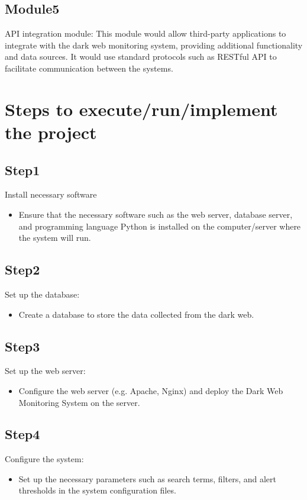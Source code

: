\documentclass[10pt]{report}
\begin{document}
\subsection{Module5}
API integration module: 
This module would allow third-party applications to integrate with the dark web monitoring system, providing additional functionality and data sources. It would use standard protocols such as RESTful API to facilitate communication between the systems.



\section{Steps to execute/run/implement the project}
\subsection{Step1}
Install necessary software
\begin{itemize}
    \item Ensure that the necessary software such as the web server, database server, and programming language Python is installed on the computer/server where the system will run. 
\end{itemize}

\subsection{Step2}
Set up the database: 
\begin{itemize}
    \item Create a database to store the data collected from the dark web.
\end{itemize}


\subsection{Step3}
Set up the web server:
\begin{itemize}
    \item Configure the web server (e.g. Apache, Nginx) and deploy the Dark Web Monitoring System on the server.
\end{itemize}

\subsection{Step4}
Configure the system:
\begin{itemize}
    \item Set up the necessary parameters such as search terms, filters, and alert thresholds in the system configuration files. 
\end{itemize}
\end{document}
